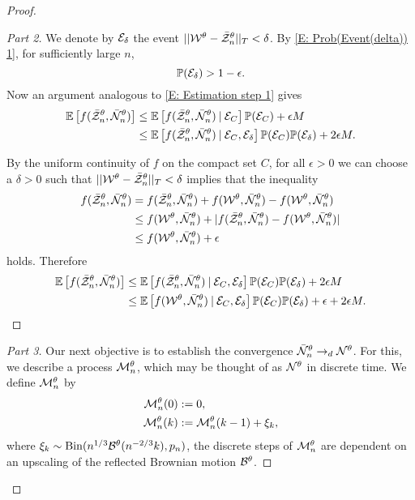 \begin{proof}
\begin{proof}[Part 2]
We denote by $\Event{\delta}$ the event $\norm{\WtX - \rzntX}_T < \delta$.
By \eqref{E: Prob(Event(delta)) 1}, for sufficiently large $n$, 
\begin{equation} \label{E: Prob Event delta}
\Prob(\Event{\delta}) > 1 - \epsilon.
\end{equation}
Now an argument analogous to \eqref{E: Estimation step 1} gives
\begin{equation} \label{E: Estimation step 2}
\begin{aligned}
\ExpBig{f(\rzntX, \rnntX) } 
&\leq \ExpBig{f(\rzntX, \rnntX) \cond \Event{C}}\Prob(\Event{C}) + \epsilon M \\
&\leq \ExpBig{f(\rzntX, \rnntX) \cond \Event{C}, \Event{\delta}}\Prob(\Event{C})\Prob(\Event{\delta}) + 2 \epsilon M.
\end{aligned}
\end{equation}

By the uniform continuity of $f$ on the compact set $C$, for all $\epsilon>0$ we can choose a $\delta > 0$ such that $\norm{\WtX - \rzntX}_T < \delta$ implies
that the inequality
\begin{equation*}
\begin{aligned}
f(\rzntX, \rnntX) &= f(\rzntX, \rnntX) + f(\WtX, \rnntX) - f(\WtX, \rnntX) \\
&\leq f(\WtX, \rnntX) + |f(\rzntX, \rnntX) - f(\WtX, \rnntX)| \\
&\leq f(\WtX, \rnntX) + \epsilon
\end{aligned}
\end{equation*}
holds. Therefore
\begin{equation} \label{E: Estimation step 3}
\begin{aligned}
\ExpBig{f(\rzntX, \rnntX) } 
&\leq \ExpBig{f(\rzntX, \rnntX) \cond \Event{C}, \Event{\delta}}\Prob(\Event{C})\Prob(\Event{\delta}) + 2 \epsilon M \\
&\leq \ExpBig{f(\WtX, \rnntX) \cond \Event{C}, \Event{\delta}}\Prob(\Event{C})\Prob(\Event{\delta}) + \epsilon + 2 \epsilon M.
\end{aligned}
\end{equation}
\end{proof}




\begin{proof}[Part 3]\renewcommand{\qedsymbol}{}
Our next objective is to establish the convergence $\rnntX \rightarrow_d \NtX$.
For this, we describe a process $\Ndis$, which may be thought of as $\NtX$ in discrete time.
We define $\Ndis$ by
\begin{equation} \label{D: Ndis}
\begin{aligned}
\Ndis(0) &:= 0, \\
\Ndis(k) &:= \Ndis(k-1) + \xi_k, 
\end{aligned}
\end{equation}
where $\xi_k \sim \Binom(\n{1}{3}\BtX(\n{-2}{3}k), \p)$,
the discrete steps of $\Ndis$ are dependent on an upscaling of the reflected Brownian motion $\BtX$.


\end{proof}
\end{proof}
